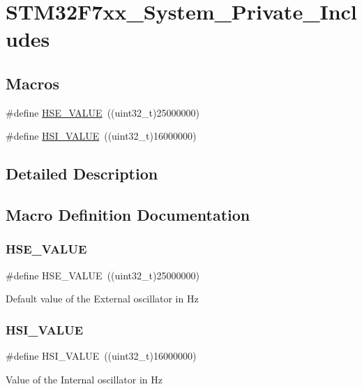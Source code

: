 \hypertarget{group___s_t_m32_f7xx___system___private___includes}{}\section{S\+T\+M32\+F7xx\+\_\+\+System\+\_\+\+Private\+\_\+\+Includes}
\label{group___s_t_m32_f7xx___system___private___includes}
\subsection*{Macros}
\begin{DoxyCompactItemize}
\item 
\#define \mbox{\hyperlink{group___s_t_m32_f7xx___system___private___includes_gaeafcff4f57440c60e64812dddd13e7cb}{H\+S\+E\+\_\+\+V\+A\+L\+UE}}~((uint32\+\_\+t)25000000)
\item 
\#define \mbox{\hyperlink{group___s_t_m32_f7xx___system___private___includes_gaaa8c76e274d0f6dd2cefb5d0b17fbc37}{H\+S\+I\+\_\+\+V\+A\+L\+UE}}~((uint32\+\_\+t)16000000)
\end{DoxyCompactItemize}


\subsection{Detailed Description}


\subsection{Macro Definition Documentation}
\mbox{\label{group___s_t_m32_f7xx___system___private___includes_gaeafcff4f57440c60e64812dddd13e7cb}} 
\subsubsection{\texorpdfstring{HSE\_VALUE}{HSE\_VALUE}}
{\footnotesize\ttfamily \#define H\+S\+E\+\_\+\+V\+A\+L\+UE~((uint32\+\_\+t)25000000)}

Default value of the External oscillator in Hz \mbox{\label{group___s_t_m32_f7xx___system___private___includes_gaaa8c76e274d0f6dd2cefb5d0b17fbc37}} 
\subsubsection{\texorpdfstring{HSI\_VALUE}{HSI\_VALUE}}
{\footnotesize\ttfamily \#define H\+S\+I\+\_\+\+V\+A\+L\+UE~((uint32\+\_\+t)16000000)}

Value of the Internal oscillator in Hz 